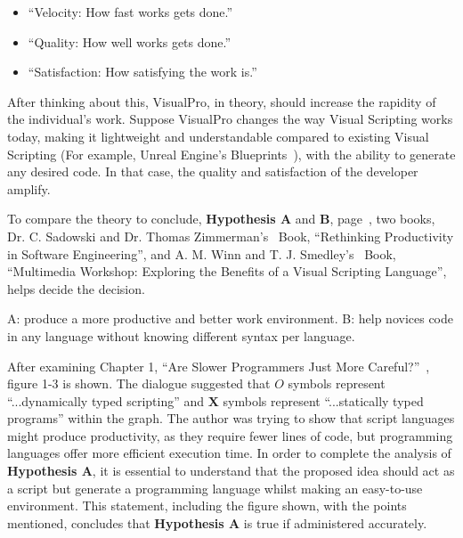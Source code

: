 \documentclass[conference]{IEEEtran}
\begin{document}
      \begin{itemize}
        \item ``Velocity: How fast works gets done.''
        \item ``Quality: How well works gets done.''
        \item ``Satisfaction: How satisfying the work is.''
      \end{itemize}

      After thinking about this, VisualPro, in theory, should increase the rapidity of the individual’s work. Suppose VisualPro changes the way Visual Scripting works today, making it lightweight and understandable compared to existing Visual Scripting (For example, Unreal Engine's Blueprints~\cite{unreal_engine_introduction_nodate}), with the ability to generate any desired code. In that case, the quality and satisfaction of the developer amplify.

      To compare the theory to conclude, \textbf{Hypothesis A} and \textbf{B}, page~\pageref{abstract}, two books, Dr. C. Sadowski and Dr. Thomas Zimmerman's~\cite{dr_caitlin_sadowski_rethinking_2019} Book, ``Rethinking Productivity in Software Engineering'', and A. M. Winn and T. J. Smedley’s~\cite{winn_multimedia_1998} Book, ``Multimedia Workshop: Exploring the Benefits of a Visual Scripting Language'', helps decide the decision.

      \begin{center}
        A: produce a more productive and better work environment.
        B: help novices code in any language without knowing different syntax per language.
      \end{center}
      
      After examining Chapter 1, ``Are Slower Programmers Just More Careful?''~\cite{dr_caitlin_sadowski_rethinking_2019}, figure 1-3 is shown. The dialogue suggested that $O$ symbols represent ``...dynamically typed scripting'' and $\mathbf{X}$ symbols represent ``...statically typed programs'' within the graph. The author was trying to show that script languages might produce productivity, as they require fewer lines of code, but programming languages offer more efficient execution time. In order to complete the analysis of \textbf{Hypothesis A}, it is essential to understand that the proposed idea should act as a script but generate a programming language whilst making an easy-to-use environment. This statement, including the figure shown, with the points mentioned, concludes that \textbf{Hypothesis A} is true if administered accurately.
\end{document}
